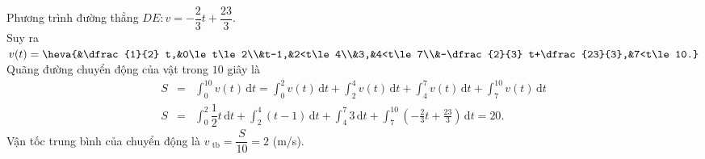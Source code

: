 \begin{bt}
{		Phương trình đường  thẳng $D E\colon v=-\dfrac{2}{3} t+\dfrac{23}{3}$.\\
		Suy ra  $v(t)=\heva{&\dfrac{1}{2} t,&0\le t\le 2\\&t-1,&2<t\le 4\\&3,&4<t\le 7\\&-\dfrac{2}{3} t+\dfrac{23}{3},&7<t\le 10.}$\\
		Quãng đường chuyển động của vật  trong $10$ giây là
		\begin{eqnarray*}
			S&=&\displaystyle\int_0^{10} v(t)\mathrm{\, d}t=\displaystyle\int_0^2 v(t)\mathrm{\, d}t+\displaystyle\int_2^4 v(t)\mathrm{\, d}t+\displaystyle\int_4^7 v(t)\mathrm{\,  d}t+\displaystyle\int_7^{10} v(t)\mathrm{\, d}t\\
			S&=&\displaystyle\int_0^2 \dfrac{1}{2}  t \mathrm{\, d} t+\displaystyle\int_2^4(t-1)\mathrm{\, d}t+\displaystyle\int_4^7 3 \mathrm{\, d} t+\displaystyle\int_7^{10}\left(-\frac{2}{3} t+\frac{23}{3}\right)\mathrm{\, d}t=20.
		\end{eqnarray*}
		Vận tốc trung bình của chuyển động là $v_{\text{ tb}}=\dfrac{S}{10}=2$ (m/s). 
	} 
\end{bt}

